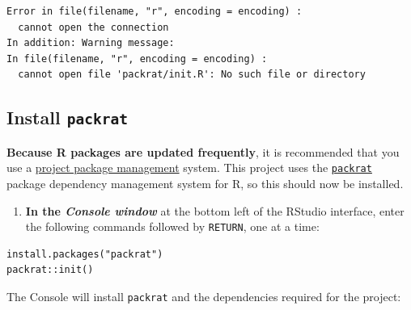 \documentclass[]{book}
\providecommand{\tightlist}{%
  \setlength{\itemsep}{0pt}\setlength{\parskip}{0pt}}
\theoremstyle{definition}
\theoremstyle{definition}
\theoremstyle{definition}
\theoremstyle{remark}
\begin{document}
\begin{verbatim}
Error in file(filename, "r", encoding = encoding) : 
  cannot open the connection
In addition: Warning message:
In file(filename, "r", encoding = encoding) :
  cannot open file 'packrat/init.R': No such file or directory
\end{verbatim}

\hypertarget{install-packrat}{%
\subsection{\texorpdfstring{Install
\texttt{packrat}}{Install packrat}}\label{install-packrat}}

\textbf{Because R packages are updated frequently}, it is recommended
that you use a
\href{http://r.stuzog.com/RStudio.html\#project-package-management}{project
package management} system. This project uses the
\href{https://rstudio.github.io/packrat/}{\texttt{packrat}} package
dependency management system for R, so this should now be installed.

\begin{enumerate}
\def\labelenumi{\arabic{enumi}.}
\setcounter{enumi}{6}
\tightlist
\item
  \textbf{In the \emph{Console window}} at the bottom left of the
  RStudio interface, enter the following commands followed by
  \texttt{RETURN}, one at a time:
\end{enumerate}

\begin{verbatim}
install.packages("packrat")
packrat::init()
\end{verbatim}

The Console will install \texttt{packrat} and the dependencies required
for the project:
\end{document}

